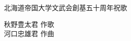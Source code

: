 \documentclass[10pt,b5j]{tarticle} %
\begin{document}
\begin{minipage}[c]{0.7\hsize} %
    \begin{center}
        {\LARGE
            北海道帝国大学文武会創基五十周年祝歌 %
        }
        {\small 
        }
    \end{center}
\end{minipage}
\begin{minipage}[c]{0.3\hsize} %
    \begin{flushright} %
        秋野豊太君 作歌\\河口忠雄君 作曲 %
    \end{flushright}
\end{minipage}
\end{document}
